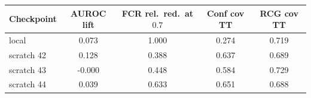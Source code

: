 \begin{tabular}{lcccc}
\toprule
Checkpoint & AUROC lift & FCR rel.\ red.\ at $0.7$ & Conf cov TT & RCG cov TT \\
\midrule
local & 0.073 & 1.000 & 0.274 & 0.719\\
scratch 42 & 0.128 & 0.388 & 0.637 & 0.689\\
scratch 43 & -0.000 & 0.448 & 0.584 & 0.729\\
scratch 44 & 0.039 & 0.633 & 0.651 & 0.688\\
\bottomrule
\end{tabular}
